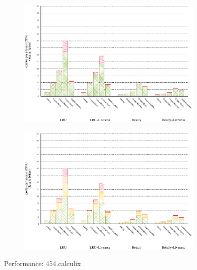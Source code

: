 \begin{figure}[!ht]
    \begin{subfigure}[b]{0.5\textwidth}%
    \includegraphics[width=\textwidth]{figs/plots/perf-misses-454-calculix.eps}
  \end{subfigure}%
  \begin{subfigure}[b]{0.5\textwidth}%
    \includegraphics[width=\textwidth]{figs/plots/perf-454-calculix.eps}
  \end{subfigure}%
  \caption{Performance: 454.calculix}
  \label{fig:performance-454-calculix}
\end{figure}

